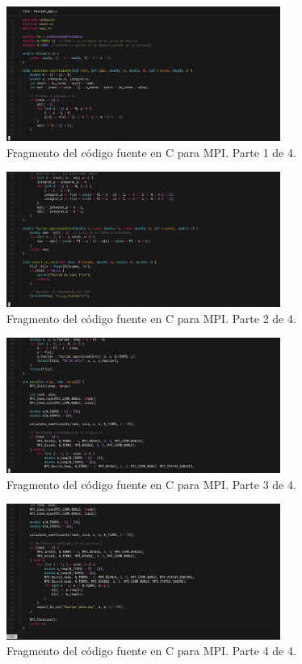 \begin{figure}[H]
	\includegraphics[width=0.8\textwidth]{media/mpi_codigo_1.png}
	\caption{Fragmento del código fuente en C para MPI. Parte 1 de 4.}
\end{figure}
\begin{figure}[H]
	\includegraphics[width=0.8\textwidth]{media/mpi_codigo_2.png}
	\caption{Fragmento del código fuente en C para MPI. Parte 2 de 4.}
\end{figure}
\begin{figure}[H]
	\includegraphics[width=0.8\textwidth]{media/mpi_codigo_3.png}
	\caption{Fragmento del código fuente en C para MPI. Parte 3 de 4.}
\end{figure}
\begin{figure}[H]
	\includegraphics[width=0.8\textwidth]{media/mpi_codigo_4.png}
	\caption{Fragmento del código fuente en C para MPI. Parte 4 de 4.}
\end{figure}

